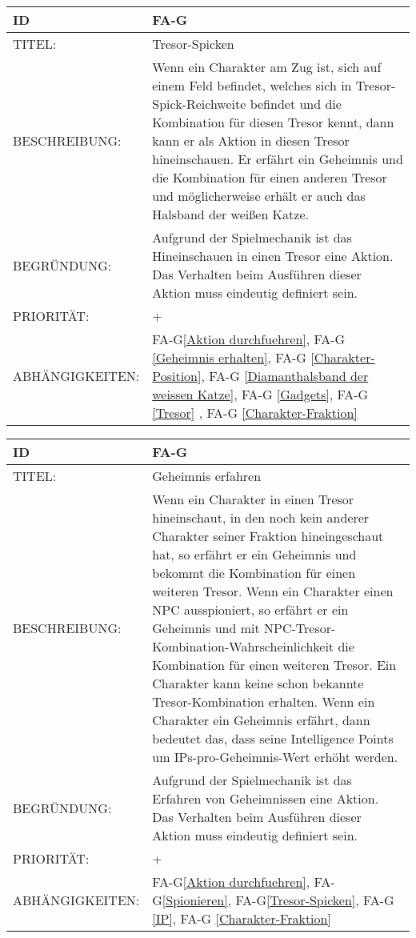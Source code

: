 \begin{tabularx}{16cm}{l|X}
	{table}\label{Tresor-Spicken}
	\textbf{ID} & \textbf{FA-G\arabic{table}} \\
	\hline
	TITEL: & Tresor-Spicken \\
	\hline
	BESCHREIBUNG: & Wenn ein Charakter am Zug ist, sich auf einem Feld befindet, welches sich in Tresor-Spick-Reichweite befindet und die Kombination für diesen Tresor kennt, dann kann er als Aktion in diesen Tresor hineinschauen. Er erfährt ein Geheimnis und die Kombination für einen anderen Tresor und möglicherweise erhält er auch das Halsband der weißen Katze.\\
	 
	\hline
	BEGRÜNDUNG: & Aufgrund der Spielmechanik ist das Hineinschauen in einen Tresor eine Aktion. Das Verhalten beim Ausführen dieser Aktion muss eindeutig definiert sein.\\
	\hline
	PRIORITÄT: & +\\
	\hline
	ABHÄNGIGKEITEN: & FA-G\ref{Aktion durchfuehren}, FA-G \ref{Geheimnis erhalten}, FA-G \ref{Charakter-Position}, FA-G \ref{Diamanthalsband der weissen Katze}, FA-G \ref{Gadgets}, FA-G \ref{Tresor} , FA-G \ref{Charakter-Fraktion} \\
\end{tabularx}

\begin{tabularx}{16cm}{l|X}
	{table}\label{Geheimnis erhalten}
	\textbf{ID} & \textbf{FA-G\arabic{table}} \\
	\hline
	TITEL: & Geheimnis erfahren \\
	\hline
	BESCHREIBUNG: & Wenn ein Charakter in einen Tresor hineinschaut, in den noch kein anderer Charakter seiner Fraktion hineingeschaut hat, so erfährt er ein Geheimnis und bekommt die Kombination für einen weiteren Tresor. Wenn ein Charakter einen NPC ausspioniert, so erfährt er ein Geheimnis und mit NPC-Tresor-Kombination-Wahrscheinlichkeit die Kombination für einen weiteren Tresor. Ein Charakter kann keine schon bekannte Tresor-Kombination erhalten. Wenn ein Charakter ein Geheimnis erfährt, dann bedeutet das, dass seine Intelligence Points um IPs-pro-Geheimnis-Wert erhöht werden. \\
	 
	\hline
	BEGRÜNDUNG: & Aufgrund der Spielmechanik ist das Erfahren von Geheimnissen eine Aktion. Das Verhalten beim Ausführen dieser Aktion muss eindeutig definiert sein.\\
	\hline
	PRIORITÄT: & +\\
	\hline

	ABHÄNGIGKEITEN: & FA-G\ref{Aktion durchfuehren}, FA-G\ref{Spionieren}, FA-G\ref{Tresor-Spicken}, FA-G \ref{IP}, FA-G \ref{Charakter-Fraktion} \\
\end{tabularx}


